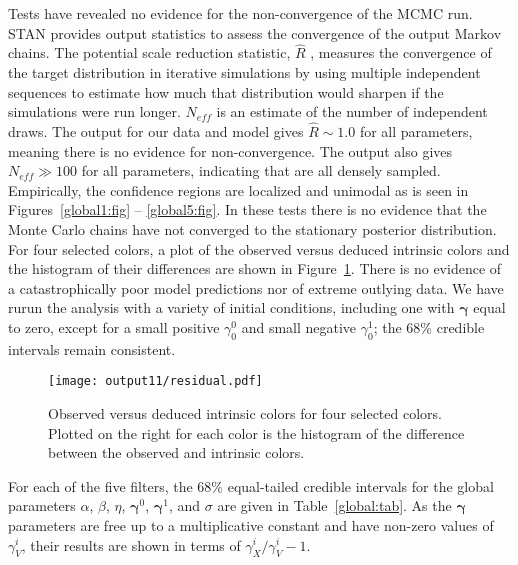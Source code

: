 \documentclass{aastex61}   	%
\begin{document}
Tests have revealed no evidence for the non-convergence of the MCMC run.
STAN provides output statistics to assess
the convergence of the output Markov chains.
The 
potential scale reduction statistic, $\hat{R}$ \citep{Gelman92}, measures the convergence of the target distribution
in iterative simulations 
by using multiple independent sequences to estimate how much that distribution would sharpen if the simulations were run longer.
$N_{eff}$ is an estimate of the number of independent draws. The output for our data and model gives $\hat{R} \sim 1.0$ for all parameters, meaning there is no evidence for non-convergence.  The
output also gives  $N_{eff} \gg 100$ for all parameters, indicating that are all densely sampled.
Empirically, the confidence regions are localized and unimodal as is seen in  Figures~\ref{global1:fig} -- \ref{global5:fig}.  In these tests there is no evidence that
the Monte Carlo chains have not converged to the stationary posterior distribution.
For four selected colors, a plot of the
observed versus deduced intrinsic colors and the histogram of their differences
are shown in Figure~\ref{residual:fig}. 
There is no evidence of a catastrophically poor model predictions nor of extreme
outlying data.
We have rurun the analysis with a variety of initial conditions, including one with $\pmb{\gamma}$ equal to zero, except for a small positive 
$\gamma^0_0$ and small negative $\gamma^1_0$; the 68\% credible intervals
remain consistent.

\begin{figure}[htbp] %
   \centering
   \texttt{[image: output11/residual.pdf]} 
            \caption{
            Observed versus deduced intrinsic colors for four selected colors.  Plotted on the right for each color
is the histogram of the difference between the observed and intrinsic colors.
            \label{residual:fig}}
\end{figure}


For each of the five filters, the 68\%  equal-tailed credible intervals for the global parameters $\alpha$, $\beta$, $\eta$, $\pmb{\gamma}^0$, $\pmb{\gamma}^1$, and $\sigma$
are given in Table~\ref{global:tab}.
As the $\pmb{\gamma}$ parameters are free up to a multiplicative constant and have non-zero values of $\gamma^i_V$,
their results are shown in terms of $\gamma^i_X/\gamma^i_V-1$.
\end{document}
